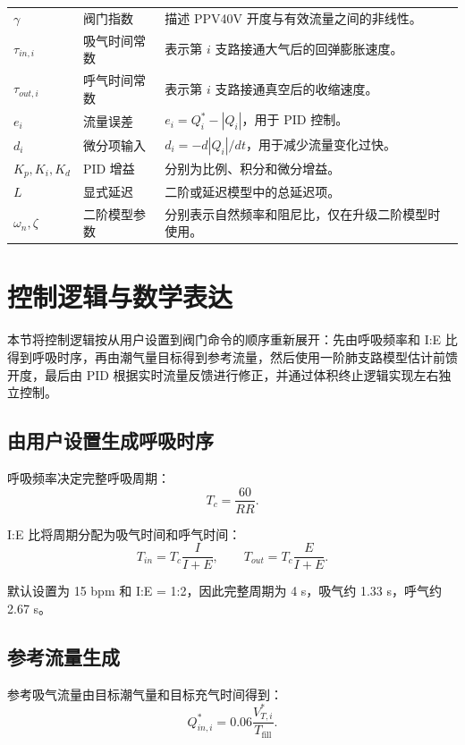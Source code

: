 \documentclass[UTF8,11pt,a4paper]{ctexart}
\begin{document}
\begin{table}[H]
\begin{tabularx}{0.96\textwidth}{
  >{\centering\arraybackslash}p{2.0cm}
  >{\raggedright\arraybackslash}p{3.2cm}
  X
}
$\gamma$ & 阀门指数 & 描述 PPV40V 开度与有效流量之间的非线性。 \\
$\tau_{in,i}$ & 吸气时间常数 & 表示第 $i$ 支路接通大气后的回弹膨胀速度。 \\
$\tau_{out,i}$ & 呼气时间常数 & 表示第 $i$ 支路接通真空后的收缩速度。 \\
$e_i$ & 流量误差 & $e_i=Q^*_i-|Q_i|$，用于 PID 控制。 \\
$d_i$ & 微分项输入 & $d_i=-d|Q_i|/dt$，用于减少流量变化过快。 \\
$K_p,K_i,K_d$ & PID 增益 & 分别为比例、积分和微分增益。 \\
$L$ & 显式延迟 & 二阶或延迟模型中的总延迟项。 \\
$\omega_n,\zeta$ & 二阶模型参数 & 分别表示自然频率和阻尼比，仅在升级二阶模型时使用。 \\
\bottomrule
\end{tabularx}
\end{table}

\section{控制逻辑与数学表达}

本节将控制逻辑按从用户设置到阀门命令的顺序重新展开：先由呼吸频率和 I:E 比得到呼吸时序，再由潮气量目标得到参考流量，然后使用一阶肺支路模型估计前馈开度，最后由 PID 根据实时流量反馈进行修正，并通过体积终止逻辑实现左右独立控制。

\subsection{由用户设置生成呼吸时序}

呼吸频率决定完整呼吸周期：
\begin{equation}
  T_c=\frac{60}{RR}.
\end{equation}

I:E 比将周期分配为吸气时间和呼气时间：
\begin{equation}
  T_{in}=T_c\frac{I}{I+E},
  \qquad
  T_{out}=T_c\frac{E}{I+E}.
\end{equation}

默认设置为 15 bpm 和 I:E = 1:2，因此完整周期为 4 s，吸气约 1.33 s，呼气约 2.67 s。

\subsection{参考流量生成}

参考吸气流量由目标潮气量和目标充气时间得到：
\begin{equation}
  Q^*_{in,i}=0.06\frac{V^*_{T,i}}{T_{\mathrm{fill}}}.
\end{equation}
\end{document}
